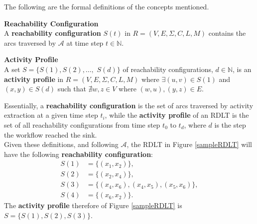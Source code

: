 The following are the formal definitions of the concepts mentioned.

\begin{defn}\label{reachabilityConfiguration} 
    \textbf{Reachability Configuration} \cite{Malinao2017} \\
    A \textbf{reachability configuration} $S(t)$ in $R = (V, E, \Sigma, C, L, M)$ contains the arcs traversed by ${\mathcal A}$ at time step $t \in {\mathbb{N}}$.
\end{defn}



\begin{defn}\label{activityProfile}
    \textbf{Activity Profile} \cite{Malinao2017} \\
    A set $S = \{S(1), S(2), \ldots,$ $S(d)\}$ of reachability configurations, $d \in {\mathbb{N}}$, is an \textbf{activity profile} in $R = (V, E, \Sigma, C, L, M)$ where $\exists(u,v) \in S(1)$ and $(x,y) \in S(d)$ such that $\nexists w, z \in V$ where $(w,u), (y, z) \in E$. 
\end{defn}
Essentially, a \textbf{reachability configuration} is the set of arcs traversed by activity extraction at a given time step $t_i$, while the \textbf{activity profile} of an RDLT is the set of all reachability configurations from time step $t_0$ to $t_d$, where $d$ is the step the workflow reached the sink. \\

Given these definitions, and following ${\mathcal{A}}$, the RDLT in Figure \ref{sampleRDLT} will have the following \textbf{reachability configuration}:
\begin{align*}
    S(1) &= \{(x_1, x_2)\}, \\
    S(2) &= \{(x_2, x_4)\}, \\
    S(3) &= \{(x_4, x_6), (x_4, x_5), (x_5, x_6)\}, \\
    S(4) &= \{(x_6, x_2)\}.
\end{align*}
The \textbf{activity profile} therefore of Figure \ref{sampleRDLT} is $S = \{S(1), S(2), S(3)\}$.

